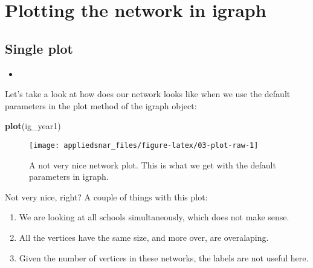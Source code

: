 \documentclass[]{book}
\newenvironment{Shaded}{\begin{snugshade}}{\end{snugshade}}
\newcommand{\KeywordTok}[1]{\textcolor[rgb]{0.13,0.29,0.53}{\textbf{#1}}}
\newcommand{\DecValTok}[1]{\textcolor[rgb]{0.00,0.00,0.81}{#1}}
\newcommand{\StringTok}[1]{\textcolor[rgb]{0.31,0.60,0.02}{#1}}
\newcommand{\OperatorTok}[1]{\textcolor[rgb]{0.81,0.36,0.00}{\textbf{#1}}}
\newcommand{\NormalTok}[1]{#1}
\theoremstyle{definition}
\theoremstyle{definition}
\theoremstyle{definition}
\theoremstyle{remark}
\begin{document}
\section{Plotting the network in
igraph}\label{plotting-the-network-in-igraph}

\subsection{Single plot}\label{single-plot}

\begin{itemize}
\item
\end{itemize}

Let's take a look at how does our network looks like when we use the
default parameters in the plot method of the igraph object:

\begin{Shaded}
\begin{Highlighting}[]
\KeywordTok{plot}\NormalTok{(ig_year1)}
\end{Highlighting}
\end{Shaded}

\begin{figure}

{\centering \texttt{[image: appliedsnar\_files/figure-latex/03-plot-raw-1]} 

}

\caption{A not very nice network plot. This is what we get with the default parameters in igraph.}\label{fig:03-plot-raw}
\end{figure}

Not very nice, right? A couple of things with this plot:

\begin{enumerate}
\def\labelenumi{\arabic{enumi}.}
\item
  We are looking at all schools simultaneously, which does not make
  sense.
\item
  All the vertices have the same size, and more over, are overalaping.
\item
  Given the number of vertices in these networks, the labels are not
  useful here.
\end{enumerate}

\begin{Shaded}
\end{Shaded}
\end{document}
